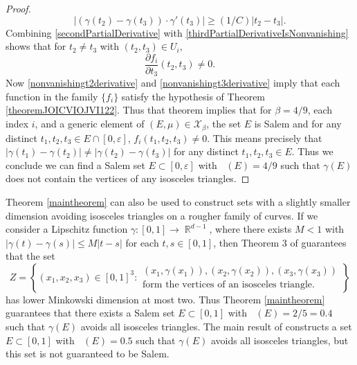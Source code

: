 \documentclass[dvipsnames,letterpaper,12pt]{article}
\numberwithin{equation}{section}
\DeclareMathOperator{\hausdim}{\dim_{\mathbb{H}}}
\DeclareMathOperator{\fordim}{\dim_{\mathbb{F}}}
\DeclareMathOperator{\RR}{\mathbb{R}}
\numberwithin{theorem}{section}
\begin{document}
\begin{proof}
    \begin{equation} \label{thirdPartialDerivativeIsNonvanishing}
        |(\gamma(t_2) - \gamma(t_3)) \cdot \gamma'(t_3)| \geq (1/C) |t_2 - t_3|.
    \end{equation}
    Combining \eqref{secondPartialDerivative} with \eqref{thirdPartialDerivativeIsNonvanishing} shows that for $t_2 \neq t_3$ with $(t_2,t_3) \in U_i$,
    \begin{equation} \label{nonvanishingt3derivative}
        \frac{\partial f_i}{\partial t_3}(t_2,t_3) \neq 0.
    \end{equation}
    Now \eqref{nonvanishingt2derivative} and \eqref{nonvanishingt3derivative} imply that each function in the family $\{ f_i \}$ satisfy the hypothesis of Theorem \ref{theoremJOICVIOJVI122}. Thus that theorem implies that for $\beta = 4/9$, each index $i$, and a generic element of $(E,\mu) \in \mathcal{X}_\beta$, the set $E$ is Salem and for any distinct $t_1,t_2,t_3 \in E \cap [0,\varepsilon]$, $f_i(t_1,t_2,t_3) \neq 0$. This means precisely that $|\gamma(t_1) - \gamma(t_2)| \neq |\gamma(t_2) - \gamma(t_3)|$ for any distinct $t_1,t_2,t_3 \in E$. Thus we conclude we can find a Salem set $E \subset [0,\varepsilon]$ with $\fordim(E) = 4/9$ such that $\gamma(E)$ does not contain the vertices of any isosceles triangles.
\end{proof}

Theorem \ref{maintheorem} can also be used to construct sets with a slightly smaller dimension avoiding isosceles triangles on a rougher family of curves. If we consider a Lipschitz function $\gamma: [0,1] \to \RR^{d-1}$, where there exists $M < 1$ with $|\gamma(t) - \gamma(s)| \leq M |t - s|$ for each $t,s \in [0,1]$, then Theorem 3 of \cite{OurPaper} guarantees that the set
%
\[ Z = \left\{ (x_1,x_2,x_3) \in [0,1]^3 : \begin{array}{c}
            \text{$(x_1,\gamma(x_1)), (x_2,\gamma(x_2)), (x_3,\gamma(x_3))$}\\
            \text{form the vertices of an isosceles triangle.} \end{array} \right\} \]
%
has lower Minkowski dimension at most two. Thus Theorem \ref{maintheorem} guarantees that there exists a Salem set $E \subset [0,1]$ with $\fordim(E) = 2/5 = 0.4$ such that $\gamma(E)$ avoids all isosceles triangles. The main result of \cite{PramanikFraser} constructs a set $E \subset [0,1]$ with $\hausdim(E) = 0.5$ such that $\gamma(E)$ avoids all isosceles triangles, but this set is not guaranteed to be Salem.
\end{document}
